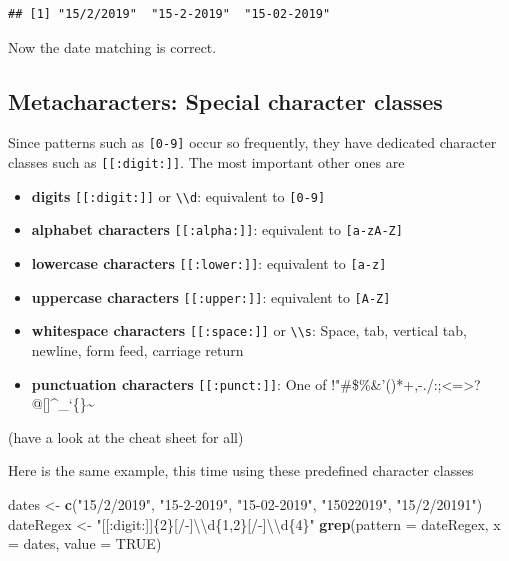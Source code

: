 \documentclass[]{book}
\newenvironment{Shaded}{\begin{snugshade}}{\end{snugshade}}
\newcommand{\CharTok}[1]{\textcolor[rgb]{0.31,0.60,0.02}{#1}}
\newcommand{\DataTypeTok}[1]{\textcolor[rgb]{0.13,0.29,0.53}{#1}}
\newcommand{\KeywordTok}[1]{\textcolor[rgb]{0.13,0.29,0.53}{\textbf{#1}}}
\newcommand{\NormalTok}[1]{#1}
\newcommand{\OtherTok}[1]{\textcolor[rgb]{0.56,0.35,0.01}{#1}}
\newcommand{\StringTok}[1]{\textcolor[rgb]{0.31,0.60,0.02}{#1}}
\providecommand{\tightlist}{%
  \setlength{\itemsep}{0pt}\setlength{\parskip}{0pt}}
\begin{document}
\begin{verbatim}
## [1] "15/2/2019"  "15-2-2019"  "15-02-2019"
\end{verbatim}

Now the date matching is correct.

\hypertarget{metacharacters-special-character-classes}{%
\subsection{Metacharacters: Special character classes}\label{metacharacters-special-character-classes}}

Since patterns such as \texttt{{[}0-9{]}} occur so frequently, they have dedicated character classes such as \texttt{{[}{[}:digit:{]}{]}}. The most important other ones are

\begin{itemize}
\tightlist
\item
  \textbf{digits} \texttt{{[}{[}:digit:{]}{]}} or \texttt{\textbackslash{}\textbackslash{}d}: equivalent to \texttt{{[}0-9{]}}
\item
  \textbf{alphabet characters} \texttt{{[}{[}:alpha:{]}{]}}: equivalent to \texttt{{[}a-zA-Z{]}}
\item
  \textbf{lowercase characters} \texttt{{[}{[}:lower:{]}{]}}: equivalent to \texttt{{[}a-z{]}}
\item
  \textbf{uppercase characters} \texttt{{[}{[}:upper:{]}{]}}: equivalent to \texttt{{[}A-Z{]}}
\item
  \textbf{whitespace characters} \texttt{{[}{[}:space:{]}{]}} or \texttt{\textbackslash{}\textbackslash{}s}: Space, tab, vertical tab, newline, form feed, carriage return
\item
  \textbf{punctuation characters} \texttt{{[}{[}:punct:{]}{]}}: One of !"\#\$\%\&'()*+,-./:;\textless{}=\textgreater{}?@{[}{]}\^{}\_`\{\textbar{}\}\textasciitilde{}
\end{itemize}

(have a look at the cheat sheet for all)

Here is the same example, this time using these predefined character classes

\begin{Shaded}
\begin{Highlighting}[]
\NormalTok{dates <-}\StringTok{ }\KeywordTok{c}\NormalTok{(}\StringTok{"15/2/2019"}\NormalTok{, }\StringTok{"15-2-2019"}\NormalTok{, }\StringTok{"15-02-2019"}\NormalTok{, }\StringTok{"15022019"}\NormalTok{, }\StringTok{"15/2/20191"}\NormalTok{)}
\NormalTok{dateRegex <-}\StringTok{ "[[:digit:]]\{2\}[/-]}\CharTok{\textbackslash{}\textbackslash{}}\StringTok{d\{1,2\}[/-]}\CharTok{\textbackslash{}\textbackslash{}}\StringTok{d\{4\}"}
\KeywordTok{grep}\NormalTok{(}\DataTypeTok{pattern =}\NormalTok{ dateRegex, }\DataTypeTok{x =}\NormalTok{ dates, }\DataTypeTok{value =} \OtherTok{TRUE}\NormalTok{)}
\end{Highlighting}
\end{Shaded}
\end{document}
